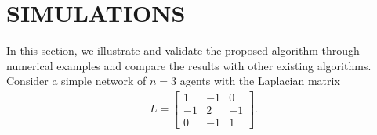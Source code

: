 \documentclass[letterpaper, 10 pt, conference]{ieeeconf}  %
\newtheorem{theorem}{Theorem}
\begin{document}






\section{SIMULATIONS}\label{cdc18so:sec:simulation}
In this section, we illustrate and validate the proposed algorithm through numerical examples and compare the results with other existing algorithms.
Consider a simple network of $n=3$ agents with the Laplacian matrix
\begin{eqnarray*}
L=\left[\begin{array}{rrrr}1&-1&0\\
-1&2&-1\\
0&-1&1
\end{array}\right].
\end{eqnarray*}
\end{document}
